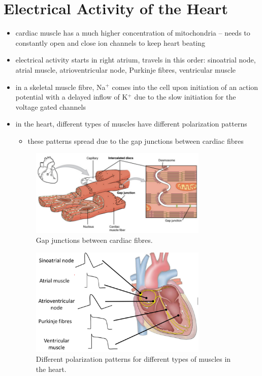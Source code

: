 \documentclass[10pt]{article}
\begin{document}
\section{Electrical Activity of the Heart}
\begin{itemize}
    \item cardiac muscle has a much higher concentration of mitochondria -- needs to constantly open and close ion channels to keep heart beating
    \item electrical activity starts in right atrium, travels in this order: sinoatrial node, atrial muscle, atrioventricular node, Purkinje fibres, ventricular muscle
    \item in a skeletal muscle fibre, Na$^+$ comes into the cell upon initiation of an action potential with a delayed inflow of K$^+$ due to the slow initiation for the voltage gated channels 
    \item in the heart, different types of muscles have different polarization patterns
        \begin{itemize}
            \item these patterns spread due to the gap junctions between cardiac fibres
        \end{itemize}
    \begin{figure}[H]
        \centering
        \includegraphics[width=0.8\textwidth]{cardiacGapJunctions}
        \caption{Gap junctions between cardiac fibres.}
        \label{fig:cardiacGapJunctions}
    \end{figure}
    \begin{figure}[H]
        \centering
        \includegraphics[width=0.8\textwidth]{cardiacMusclePolarizationPatterns}
        \caption{Different polarization patterns for different types of muscles in the heart.}
        \label{fig:cardiacMusclePolarizationPatterns}
    \end{figure}
\end{itemize}
\end{document}
